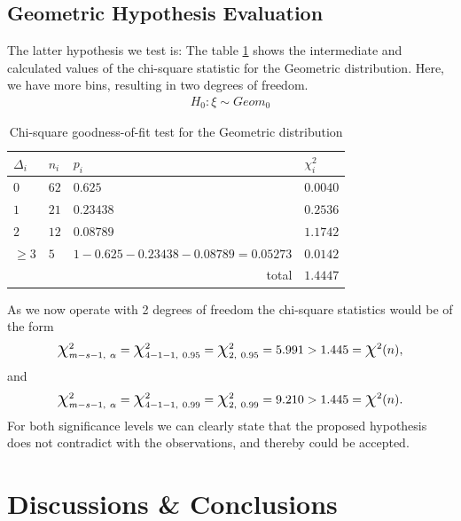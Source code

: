 \documentclass[final,3p,times,onecolumn]{elsarticle}
\begin{document}
\subsection{Geometric Hypothesis Evaluation}
The latter hypothesis we test is: 
The table \ref{tab:chi_geometric} 
shows the intermediate and calculated values of the chi-square statistic for the Geometric distribution.
Here, we have more bins, resulting in two degrees of freedom. 
\begin{gather*}
H_0: \xi \sim Geom_0
\end{gather*}
\begin{table}[ht]
\centering
\setlength{\tabcolsep}{10pt}
\renewcommand{\arraystretch}{1.25}
\caption{Chi-square goodness-of-fit test for the Geometric distribution}
\label{tab:chi_geometric}
\begin{tabular}{llll}
\toprule
$\Delta_i$ & $n_i$ & $p_i$ & $\chi^2_i$ \\
\midrule
$0$ 
& $62$ 
& $0.625$ 
& $0.0040$ \\

$1$ 
& $21$ 
& $0.23438$ 
& $0.2536$ \\

$2$ 
& $12$ 
& $0.08789$ 
& $1.1742$ \\

$\geq 3$ 
& $5$ 
& $1 - 0.625 - 0.23438 - 0.08789 = 0.05273$ 
& $0.0142$ \\

\midrule
\multicolumn{3}{r}{total} & $1.4447$ \\
\bottomrule
\end{tabular}
\end{table}
As we now operate with 2 degrees of freedom the chi-square statistics would be of the form
\begin{gather*}
\scalebox{1.5}{$\chi$}^2_{m - s - 1, \ \alpha} = \scalebox{1.5}{$\chi$}^2_{4 - 1 - 1, \ 0.95} = \scalebox{1.5}{$\chi$}^2_{2, \ 0.95} =  5.991 > 1.445 = \scalebox{1.5}{$\chi$}^2(n),
\end{gather*}
and
\begin{gather*}
\scalebox{1.5}{$\chi$}^2_{m - s - 1, \ \alpha} = \scalebox{1.5}{$\chi$}^2_{4 - 1 - 1, \ 0.99} = \scalebox{1.5}{$\chi$}^2_{2, \ 0.99} =  9.210 > 1.445 = \scalebox{1.5}{$\chi$}^2(n).
\end{gather*}
For both significance levels we can clearly state that the proposed hypothesis does not contradict with the observations, and thereby could be accepted.

\section{Discussions \& Conclusions}
\end{document}
